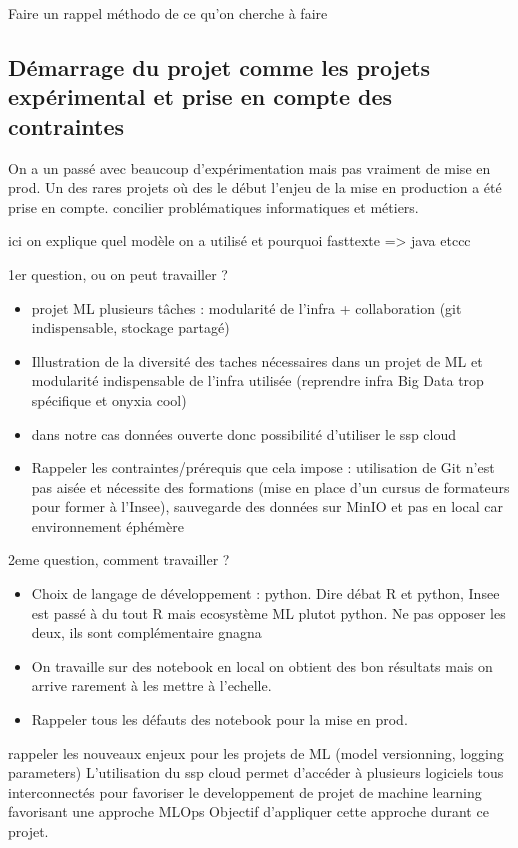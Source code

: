 Faire un rappel méthodo de ce qu'on cherche à faire

\subsection{Démarrage du projet comme les projets expérimental et prise en compte des contraintes}

On a un passé avec beaucoup d'expérimentation mais pas vraiment de mise en prod. Un des rares projets où des le début l'enjeu de la mise en production a été prise en compte. concilier problématiques
informatiques et métiers.

ici on explique quel modèle on a utilisé et pourquoi fasttexte => java etccc

1er question, ou on peut travailler ? 
\begin{itemize}

    \item projet ML plusieurs tâches : modularité de l'infra + collaboration (git indispensable, stockage partagé)
    \item Illustration de la diversité des taches nécessaires dans un projet de ML et modularité indispensable de l'infra utilisée (reprendre infra Big Data trop spécifique et onyxia cool)
    \item dans notre cas données ouverte donc possibilité d'utiliser le ssp cloud
    \item Rappeler les contraintes/prérequis que cela impose : utilisation de Git n'est pas aisée et nécessite des formations (mise en place d'un cursus de formateurs pour former à l'Insee), sauvegarde des données sur MinIO et pas en  local car environnement éphémère
\end{itemize}

2eme question, comment travailler ?
\begin{itemize}
    \item Choix de langage de développement : python. Dire débat R et python, Insee est passé à du tout R mais ecosystème ML plutot python. Ne pas opposer les deux, ils sont complémentaire gnagna
    \item On travaille sur des notebook en local on obtient des bon résultats mais on arrive rarement à les mettre à l'echelle. 
    \item Rappeler tous les défauts des notebook pour la mise en prod. 
\end{itemize}


rappeler les nouveaux enjeux pour les projets de ML (model versionning, logging parameters) 
L'utilisation du ssp cloud permet d'accéder à plusieurs logiciels tous interconnectés pour favoriser le developpement de projet de machine learning favorisant une approche MLOps
Objectif d'appliquer cette approche durant ce projet.

